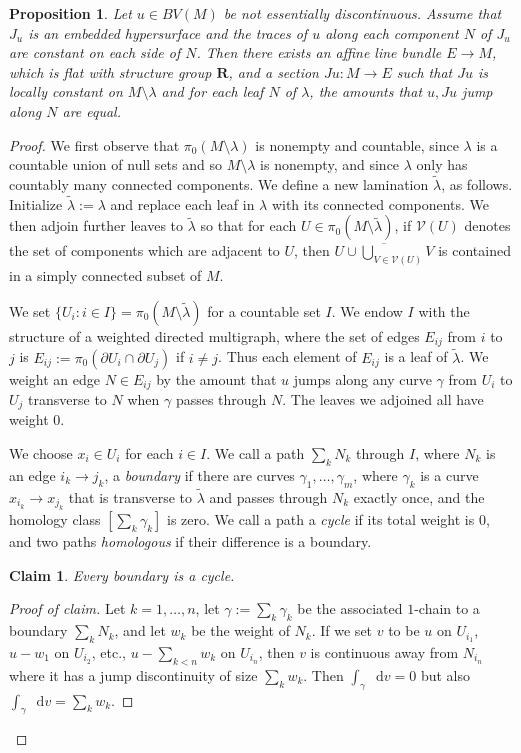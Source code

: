 \documentclass[reqno,10pt]{amsart}
\newcommand{\RR}{\mathbf{R}}
\newcommand*\dif{\mathop{}\!\mathrm{d}}
\newcommand{\dfn}[1]{\emph{#1}\index{#1}}
\newtheorem{proposition}[theorem]{Proposition}
\newtheorem*{claim}{Claim}
\theoremstyle{definition}
\numberwithin{equation}{section}
\begin{document}
\begin{proposition}\label{existence of jump graphs}
Let $u \in BV(M)$ be not essentially discontinuous.
Assume that $J_u$ is an embedded hypersurface and the traces of $u$ along each component $N$ of $J_u$ are constant on each side of $N$.
Then there exists an affine line bundle $E \to M$, which is flat with structure group $\RR$, and a section $Ju: M \to E$ such that $Ju$ is locally constant on $M \setminus \lambda$ and for each leaf $N$ of $\lambda$, the amounts that $u, Ju$ jump along $N$ are equal.
\end{proposition}
\begin{proof}
We first observe that $\pi_0(M \setminus \lambda)$ is nonempty and countable, since $\lambda$ is a countable union of null sets and so $M \setminus \lambda$ is nonempty, and since $\lambda$ only has countably many connected components.
We define a new lamination $\tilde \lambda$, as follows. Initialize $\tilde \lambda := \lambda$ and replace each leaf in $\lambda$ with its connected components.
We then adjoin further leaves to $\tilde \lambda$ so that for each $U \in \pi_0(M \setminus \tilde \lambda)$, if $\mathcal V(U)$ denotes the set of components which are adjacent to $U$, then $\overline{U \cup \bigcup_{V \in \mathcal V(U)} V}$ is contained in a simply connected subset of $M$.

We set $\{U_i: i \in I\} = \pi_0(M \setminus \tilde \lambda)$ for a countable set $I$.
We endow $I$ with the structure of a weighted directed multigraph, where the set of edges $E_{ij}$ from $i$ to $j$ is $E_{ij} := \pi_0(\partial U_i \cap \partial U_j)$ if $i \neq j$.
Thus each element of $E_{ij}$ is a leaf of $\tilde \lambda$.
We weight an edge $N \in E_{ij}$ by the amount that $u$ jumps along any curve $\gamma$ from $U_i$ to $U_j$ transverse to $N$ when $\gamma$ passes through $N$.
The leaves we adjoined all have weight $0$.

We choose $x_i \in U_i$ for each $i \in I$.
We call a path $\sum_k N_k$ through $I$, where $N_k$ is an edge $i_k \to j_k$, a \dfn{boundary} if there are curves $\gamma_1, \dots, \gamma_m$, where $\gamma_k$ is a curve $x_{i_k} \to x_{j_k}$ that is transverse to $\tilde \lambda$ and passes through $N_k$ exactly once, and the homology class $[\sum_k \gamma_k]$ is zero.
We call a path a \dfn{cycle} if its total weight is $0$, and two paths \dfn{homologous} if their difference is a boundary.

\begin{claim}
Every boundary is a cycle.
\end{claim}
\begin{proof}[Proof of claim]
Let $k = 1, \dots, n$, let $\gamma := \sum_k \gamma_k$ be the associated $1$-chain to a boundary $\sum_k N_k$, and let $w_k$ be the weight of $N_k$.
If we set $v$ to be $u$ on $U_{i_1}$, $u - w_1$ on $U_{i_2}$, etc., $u - \sum_{k < n} w_k$ on $U_{i_n}$, then $v$ is continuous away from $N_{i_n}$ where it has a jump discontinuity of size $\sum_k w_k$.
Then $\int_\gamma \dif v = 0$ but also $\int_\gamma \dif v = \sum_k w_k$.
\end{proof}


\end{proof}
\end{document}
